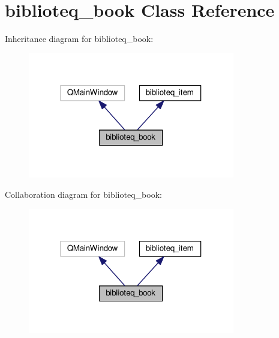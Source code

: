 \hypertarget{classbiblioteq__book}{}\section{biblioteq\+\_\+book Class Reference}
\label{classbiblioteq__book}


Inheritance diagram for biblioteq\+\_\+book\+:
\nopagebreak
\begin{figure}[H]
\begin{center}
\leavevmode
\includegraphics[width=256pt]{classbiblioteq__book__inherit__graph}
\end{center}
\end{figure}


Collaboration diagram for biblioteq\+\_\+book\+:
\nopagebreak
\begin{figure}[H]
\begin{center}
\leavevmode
\includegraphics[width=256pt]{classbiblioteq__book__coll__graph}
\end{center}
\end{figure}

